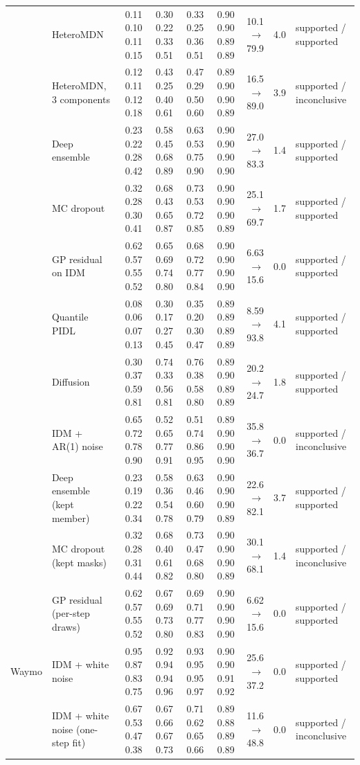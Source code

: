 \begin{longtable}{llrrrrrrl}
 & HeteroMDN & 0.11 0.10 0.11 0.15 & 0.30 0.22 0.33 0.51 & 0.33 0.25 0.36 0.51 & 0.90 0.90 0.89 0.89 & 10.1 $\rightarrow$ 79.9 & 4.0 & supported / supported \\
 & HeteroMDN, 3 components & 0.12 0.11 0.12 0.18 & 0.43 0.25 0.40 0.61 & 0.47 0.29 0.50 0.60 & 0.89 0.90 0.90 0.89 & 16.5 $\rightarrow$ 89.0 & 3.9 & supported / inconclusive \\
 & Deep ensemble & 0.23 0.22 0.28 0.42 & 0.58 0.45 0.68 0.89 & 0.63 0.53 0.75 0.90 & 0.90 0.90 0.90 0.90 & 27.0 $\rightarrow$ 83.3 & 1.4 & supported / supported \\
 & MC dropout & 0.32 0.28 0.30 0.41 & 0.68 0.43 0.65 0.87 & 0.73 0.53 0.72 0.85 & 0.90 0.90 0.90 0.89 & 25.1 $\rightarrow$ 69.7 & 1.7 & supported / supported \\
 & GP residual on IDM & 0.62 0.57 0.55 0.52 & 0.65 0.69 0.74 0.80 & 0.68 0.72 0.77 0.84 & 0.90 0.90 0.90 0.90 & 6.63 $\rightarrow$ 15.6 & 0.0 & supported / supported \\
 & Quantile PIDL & 0.08 0.06 0.07 0.13 & 0.30 0.17 0.27 0.45 & 0.35 0.20 0.30 0.47 & 0.89 0.89 0.89 0.89 & 8.59 $\rightarrow$ 93.8 & 4.1 & supported / supported \\
 & Diffusion & 0.30 0.37 0.59 0.81 & 0.74 0.33 0.56 0.81 & 0.76 0.38 0.58 0.80 & 0.89 0.90 0.89 0.89 & 20.2 $\rightarrow$ 24.7 & 1.8 & supported / supported \\
 & IDM + AR(1) noise & 0.65 0.72 0.78 0.90 & 0.52 0.65 0.77 0.91 & 0.51 0.74 0.86 0.95 & 0.89 0.90 0.90 0.90 & 35.8 $\rightarrow$ 36.7 & 0.0 & supported / inconclusive \\
 & Deep ensemble (kept member) & 0.23 0.19 0.22 0.34 & 0.58 0.36 0.54 0.78 & 0.63 0.46 0.60 0.79 & 0.90 0.90 0.90 0.89 & 22.6 $\rightarrow$ 82.1 & 3.7 & supported / supported \\
 & MC dropout (kept masks) & 0.32 0.28 0.31 0.44 & 0.68 0.40 0.61 0.82 & 0.73 0.47 0.68 0.80 & 0.90 0.90 0.90 0.89 & 30.1 $\rightarrow$ 68.1 & 1.4 & supported / inconclusive \\
 & GP residual (per-step draws) & 0.62 0.57 0.55 0.52 & 0.67 0.69 0.73 0.80 & 0.69 0.71 0.77 0.83 & 0.90 0.90 0.90 0.90 & 6.62 $\rightarrow$ 15.6 & 0.0 & supported / supported \\
\midrule
Waymo & IDM + white noise & 0.95 0.87 0.83 0.75 & 0.92 0.94 0.94 0.96 & 0.93 0.95 0.95 0.97 & 0.90 0.90 0.91 0.92 & 25.6 $\rightarrow$ 37.2 & 0.0 & supported / supported \\
 & IDM + white noise (one-step fit) & 0.67 0.53 0.47 0.38 & 0.67 0.66 0.67 0.73 & 0.71 0.62 0.65 0.66 & 0.89 0.88 0.89 0.89 & 11.6 $\rightarrow$ 48.8 & 0.0 & supported / inconclusive \\

\end{longtable}
